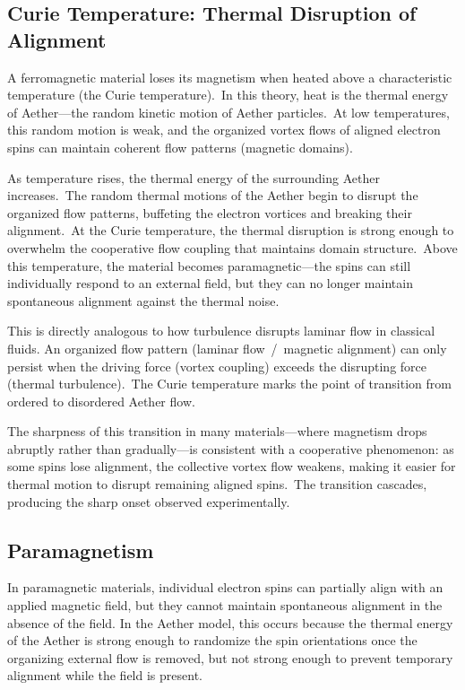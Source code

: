 ﻿\documentclass[12pt,letterpaper]{article}
\begin{document}
\subsection{Curie Temperature: Thermal Disruption of Alignment}

A ferromagnetic material loses its magnetism when heated above a characteristic temperature
(the Curie temperature).\ In this theory, heat is the thermal energy of Aether---the
random kinetic motion of Aether particles.\ At low temperatures, this random motion is
weak, and the organized vortex flows of aligned electron spins can maintain coherent flow
patterns (magnetic domains).

As temperature rises, the thermal energy of the surrounding Aether increases.\ The random
thermal motions of the Aether begin to disrupt the organized flow patterns, buffeting the
electron vortices and breaking their alignment.\ At the Curie temperature, the thermal
disruption is strong enough to overwhelm the cooperative flow coupling that maintains
domain structure.\ Above this temperature, the material becomes paramagnetic---the spins
can still individually respond to an external field, but they can no longer maintain
spontaneous alignment against the thermal noise.

This is directly analogous to how turbulence disrupts laminar flow in classical fluids.
An organized flow pattern (laminar flow~/~magnetic alignment) can only persist when the
driving force (vortex coupling) exceeds the disrupting force (thermal turbulence).\ The
Curie temperature marks the point of transition from ordered to disordered Aether flow.

The sharpness of this transition in many materials---where magnetism drops abruptly rather
than gradually---is consistent with a cooperative phenomenon: as some spins lose
alignment, the collective vortex flow weakens, making it easier for thermal motion to
disrupt remaining aligned spins.\ The transition cascades, producing the sharp onset
observed experimentally.


\subsection{Paramagnetism}

In paramagnetic materials, individual electron spins can partially align with an applied
magnetic field, but they cannot maintain spontaneous alignment in the absence of the field.
In the Aether model, this occurs because the thermal energy of the Aether is strong enough
to randomize the spin orientations once the organizing external flow is removed, but not
strong enough to prevent temporary alignment while the field is present.
\end{document}
